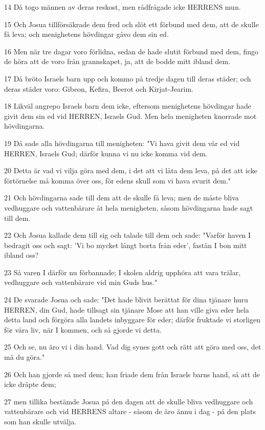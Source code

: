 \par 14 Då togo männen av deras reskost, men rådfrågade icke HERRENS mun.
\par 15 Och Josua tillförsäkrade dem fred och slöt ett förbund med dem, att de skulle få leva; och menighetens hövdingar gåvo dem sin ed.
\par 16 Men när tre dagar voro förlidna, sedan de hade slutit förbund med dem, fingo de höra att de voro från grannskapet, ja, att de bodde mitt ibland dem.
\par 17 Då bröto Israels barn upp och kommo på tredje dagen till deras städer; och deras städer voro: Gibeon, Kefira, Beerot och Kirjat-Jearim.
\par 18 Likväl angrepo Israels barn dem icke, eftersom menighetens hövdingar hade givit dem sin ed vid HERREN, Israels Gud. Men hela menigheten knorrade mot hövdingarna.
\par 19 Då sade alla hövdingarna till menigheten: "Vi hava givit dem vår ed vid HERREN, Israels Gud; därför kunna vi nu icke komma vid dem.
\par 20 Detta är vad vi vilja göra med dem, i det att vi låta dem leva, på det att icke förtörnelse må komma över oss, för edens skull som vi hava svurit dem."
\par 21 Och hövdingarna sade till dem att de skulle få leva; men de måste bliva vedhuggare och vattenbärare åt hela menigheten, såsom hövdingarna hade sagt till dem.
\par 22 Och Josua kallade dem till sig och talade till dem och sade: "Varför haven I bedragit oss och sagt: 'Vi bo mycket långt borta från eder', fastän I bon mitt ibland oss?
\par 23 Så varen I därför nu förbannade; I skolen aldrig upphöra att vara trälar, vedhuggare och vattenbärare vid min Guds hus."
\par 24 De svarade Josua och sade: "Det hade blivit berättat för dina tjänare huru HERREN, din Gud, hade tillsagt sin tjänare Mose att han ville giva eder hela detta land och förgöra alla landets inbyggare för eder; därför fruktade vi storligen för våra liv, när I kommen, och så gjorde vi detta.
\par 25 Och se, nu äro vi i din hand. Vad dig synes gott och rätt att göra med oss, det må du göra."
\par 26 Och han gjorde så med dem; han friade dem från Israels barns hand, så att de icke dräpte dem;
\par 27 men tillika bestämde Josua på den dagen att de skulle bliva vedhuggare och vattenbärare och vid HERRENS altare - såsom de äro ännu i dag - på den plats som han skulle utvälja.


